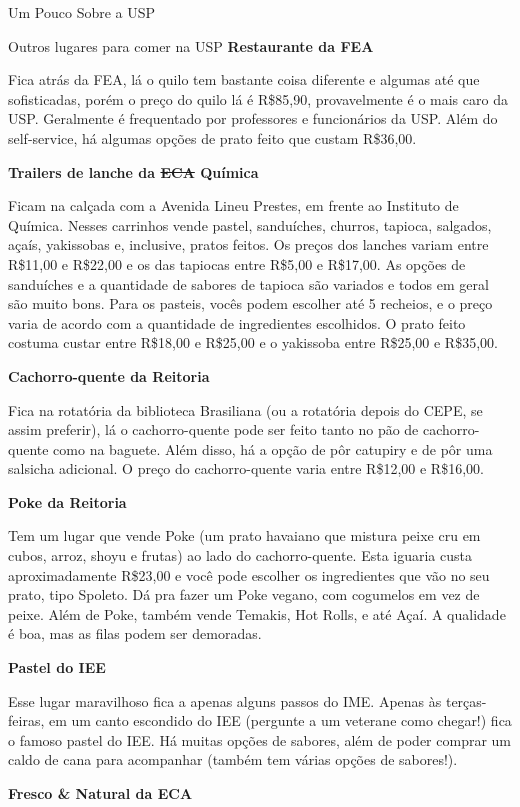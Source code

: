 \begin{secao}{Um Pouco Sobre a USP}
\begin{subsecao}{Outros lugares para comer na USP}
\textbf{Restaurante da FEA}

Fica atrás da FEA, lá o quilo tem bastante coisa diferente e algumas até que
sofisticadas, porém o preço do quilo lá é R\$85,90, provavelmente é o mais caro
da USP. Geralmente é frequentado por professores e funcionários da USP. Além do
self-service, há algumas opções de prato feito que custam R\$36,00.

\textbf{Trailers de lanche da \sout{ECA} Química}

Ficam na calçada com a Avenida Lineu Prestes, em frente ao Instituto de Química. 
Nesses carrinhos vende pastel, sanduíches, churros, tapioca, salgados, açaís, yakissobas e, 
inclusive, pratos feitos. Os preços dos lanches variam entre R\$11,00 e R\$22,00 e os das tapiocas 
entre R\$5,00 e R\$17,00. As opções de sanduíches e a quantidade de sabores de tapioca 
são variados e todos em geral são muito bons. Para os pasteis, vocês podem escolher até 5 recheios, 
e o preço varia de acordo com a quantidade de ingredientes escolhidos. O prato feito costuma custar 
entre R\$18,00 e R\$25,00 e o yakissoba entre R\$25,00 e R\$35,00.

\textbf{Cachorro-quente da Reitoria}

Fica na rotatória da biblioteca Brasiliana (ou a rotatória depois do CEPE, se assim preferir),
lá o cachorro-quente pode ser feito tanto no pão de cachorro-quente como na baguete. Além disso,
há a opção de pôr catupiry e de pôr uma salsicha adicional. O preço do cachorro-quente varia
entre R\$12,00 e R\$16,00.

\textbf{Poke da Reitoria}

Tem um lugar que vende Poke (um prato havaiano que mistura peixe cru em cubos,
arroz, shoyu e frutas) ao lado do cachorro-quente. Esta iguaria custa
aproximadamente R\$23,00 e você pode escolher os ingredientes que vão no seu prato,
tipo Spoleto. Dá pra fazer um Poke vegano, com cogumelos em vez de peixe. Além de
Poke, também vende Temakis, Hot Rolls, e até Açaí. A qualidade é boa, mas as filas
podem ser demoradas.

\textbf{Pastel do IEE}

Esse lugar maravilhoso fica a apenas alguns passos do IME. Apenas às terças-feiras,
em um canto escondido do IEE (pergunte a um veterane como chegar!) fica o famoso pastel do IEE.
Há muitas opções de sabores, além de poder comprar um caldo de cana para acompanhar (também tem 
várias opções de sabores!).

\textbf{Fresco & Natural da ECA}


\end{subsecao}
\end{secao}
